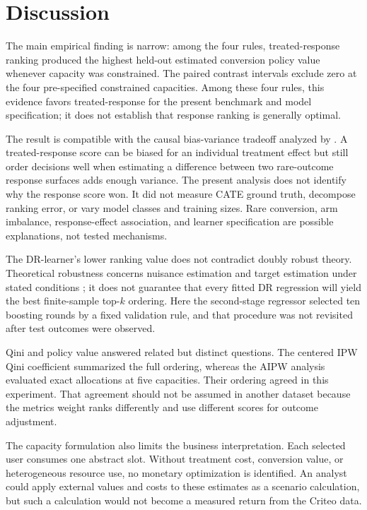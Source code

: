 \documentclass[11pt]{article}
\begin{document}
\FloatBarrier

\section{Discussion}

The main empirical finding is narrow: among the four rules, treated-response ranking produced the highest held-out estimated conversion policy value whenever capacity was constrained. The paired contrast intervals exclude zero at the four pre-specified constrained capacities. Among these four rules, this evidence favors treated-response for the present benchmark and model specification; it does not establish that response ranking is generally optimal.

The result is compatible with the causal bias-variance tradeoff analyzed by \citet{fernandezloria2022causal}. A treated-response score can be biased for an individual treatment effect but still order decisions well when estimating a difference between two rare-outcome response surfaces adds enough variance. The present analysis does not identify why the response score won. It did not measure CATE ground truth, decompose ranking error, or vary model classes and training sizes. Rare conversion, arm imbalance, response-effect association, and learner specification are possible explanations, not tested mechanisms.

The DR-learner's lower ranking value does not contradict doubly robust theory. Theoretical robustness concerns nuisance estimation and target estimation under stated conditions \citep{chernozhukov2018dml,kennedy2023dr}; it does not guarantee that every fitted DR regression will yield the best finite-sample top-$k$ ordering. Here the second-stage regressor selected ten boosting rounds by a fixed validation rule, and that procedure was not revisited after test outcomes were observed.

Qini and policy value answered related but distinct questions. The centered IPW Qini coefficient summarized the full ordering, whereas the AIPW analysis evaluated exact allocations at five capacities. Their ordering agreed in this experiment. That agreement should not be assumed in another dataset because the metrics weight ranks differently and use different scores for outcome adjustment.

The capacity formulation also limits the business interpretation. Each selected user consumes one abstract slot. Without treatment cost, conversion value, or heterogeneous resource use, no monetary optimization is identified. An analyst could apply external values and costs to these estimates as a scenario calculation, but such a calculation would not become a measured return from the Criteo data.
\end{document}
